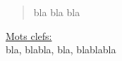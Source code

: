 \maketitle
\tableofcontents{}
\newpage

\begin{abstract}
bla bla bla
\end{abstract}
\underline{Mots clefs:}\\
bla, blabla, bla, blablabla



